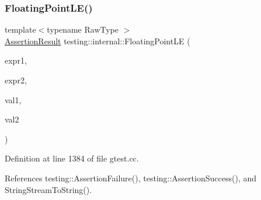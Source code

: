 \subsubsection{\texorpdfstring{Floating\+Point\+L\+E()}{FloatingPointLE()}}
{\footnotesize\ttfamily template$<$typename Raw\+Type $>$ \\
\hyperlink{classtesting_1_1AssertionResult}{Assertion\+Result} testing\+::internal\+::\+Floating\+Point\+LE (\begin{DoxyParamCaption}\item[{const char $\ast$}]{expr1,  }\item[{const char $\ast$}]{expr2,  }\item[{Raw\+Type}]{val1,  }\item[{Raw\+Type}]{val2 }\end{DoxyParamCaption})}



Definition at line 1384 of file gtest.\+cc.



References testing\+::\+Assertion\+Failure(), testing\+::\+Assertion\+Success(), and String\+Stream\+To\+String().


